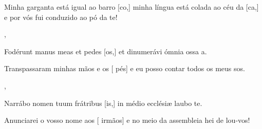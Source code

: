 {        {\item {}Minha garganta está igual ao barro [co,] minha língua está colada ao céu da [ca,] e por vós fui conduzido ao pó da te!},
    {\item {}Fodérunt manus meas et pedes [os,] et dinumerávi ómnia ossa a.}%
        {\item {}Transpassaram minhas mãos e os [ pés] e eu posso contar todos os meus sos.},
    {\item {}Narrábo nomen tuum frátribus [is,] in médio ecclésiæ laubo te.}%
        {\item {}Anunciarei o vosso nome aos [ irmãos] e no meio da assembleia hei de lou-vos!}
}